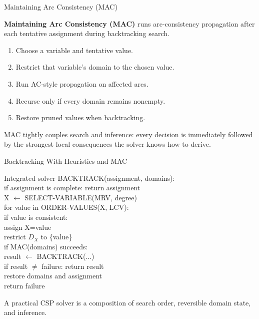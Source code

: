 \documentclass[aspectratio=169,10pt]{beamer}
\begin{document}
\begin{frame}[shrink=20]{Maintaining Arc Consistency (MAC)}
  \begin{cpdefinition}
    \textbf{Maintaining Arc Consistency (MAC)} runs arc-consistency propagation after each tentative assignment during backtracking search.
  \end{cpdefinition}

  \begin{enumerate}
    \item Choose a variable and tentative value.
    \item Restrict that variable's domain to the chosen value.
    \item Run AC-style propagation on affected arcs.
    \item Recurse only if every domain remains nonempty.
    \item Restore pruned values when backtracking.
  \end{enumerate}

  \begin{keyidea}
    MAC tightly couples search and inference: every decision is immediately followed by the strongest local consequences the solver knows how to derive.
  \end{keyidea}
\end{frame}

\begin{frame}[shrink=20]{Backtracking With Heuristics and MAC}
  \begin{block}{Integrated solver}
  \ttfamily\small
  BACKTRACK(assignment, domains):\\
  \quad if assignment is complete: return assignment\\
  \quad X $\leftarrow$ SELECT-VARIABLE(MRV, degree)\\[0.03in]
  \quad for value in ORDER-VALUES(X, LCV):\\
  \qquad if value is consistent:\\
  \qquad\quad assign X=value\\
  \qquad\quad restrict $D_X$ to \{value\}\\
  \qquad\quad if MAC(domains) succeeds:\\
  \qquad\qquad result $\leftarrow$ BACKTRACK(...)\\
  \qquad\qquad if result $\neq$ failure: return result\\
  \qquad\quad restore domains and assignment\\
  \quad return failure
  \end{block}

  \begin{keyidea}
    A practical CSP solver is a composition of search order, reversible domain state, and inference.
  \end{keyidea}
\end{frame}
\end{document}
